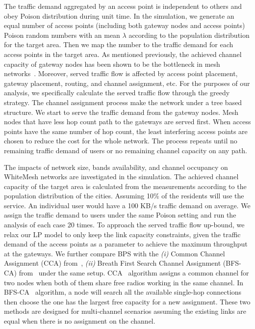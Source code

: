 The traffic demand aggregated by an access point is independent to others and obey Poison distribution
during unit time. 
In the simulation, we generate an equal number of access points (including both gateway nodes and 
access points) Poison random numbers with an mean $\lambda$ according to the population distribution 
for the target area. Then we map the number to the traffic demand for each access points in the 
target area.
As mentioned previously, the achieved channel capacity of gateway nodes has been shown to be the bottleneck in mesh 
networks~\cite{robinson2010deploying}. Moreover, served traffic flow is affected by access point placement, 
gateway placement, routing, and channel assignment, etc. For the purposes of our analysis, we specifically 
calculate the served traffic flow through the greedy strategy. 
The channel assignment process make the network under a tree based structure. We start to serve the traffic 
demand from the gateway nodes. Mesh nodes that have less hop count path to the gateways are served first. 
When access points have the same number of hop count, the least interfering access points are chosen to 
reduce the cost for the whole network. The process repeats until no remaining traffic demand of users 
or no remaining channel capacity on any path.

The impacts of network size, bands availability, and channel occupancy on WhiteMesh networks are 
investigated in the simulation. The achieved channel capacity of the target area is calculated from the 
measurements according to the population distribution of the cities. Assuming 10\% of the residents will use the 
service. An individual user would have a 100 KB/s traffic demand on average. 
We assign the traffic demand to users under the same Poison setting and run the analysis 
of each case 20 times. To approach the served traffic flow up-bound, we relax our LP model to only keep 
the link capacity constraints, given the traffic demand of the access points as a parameter to achieve 
the maximum throughput at the gateways. We further compare BPS with the 
{\it (i)} Common Channel Assignment (CCA) from~\cite{draves2004routing},
{\it (ii)} Breath First Search Channel Assignment (BFS-CA) from~\cite{tang2005interference}
under the same setup.
CCA~\cite{draves2004routing} algorithm assigns a common channel for two nodes when both of them 
share free radios working in the same channel. In BFS-CA~\cite{tang2005interference} algorithm, 
a node will search all the available single-hop connections then choose the one has the largest 
free capacity for a new assignment. 
These two methods are designed for multi-channel scenarios assuming the existing 
links are equal when there is no assignment on the channel. 



